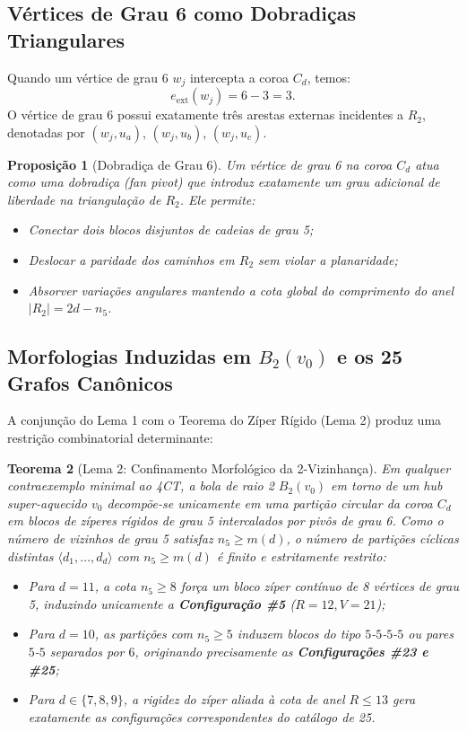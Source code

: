 \documentclass[11pt,a4paper]{article}
\theoremstyle{plain}
\newtheorem{theorem}{Teorema}[section]
\newtheorem{proposition}[theorem]{Proposição}
\theoremstyle{definition}
\begin{document}
\subsection{Vértices de Grau 6 como Dobradiças Triangulares}

Quando um vértice de grau 6 $w_j$ intercepta a coroa $C_d$, temos:
\begin{equation}
e_{\text{ext}}(w_j) = 6 - 3 = 3.
\end{equation}
O vértice de grau 6 possui exatamente três arestas externas incidentes a $R_2$, denotadas por $(w_j, u_a)$, $(w_j, u_b)$, $(w_j, u_c)$. 

\begin{proposition}[Dobradiça de Grau 6]
Um vértice de grau 6 na coroa $C_d$ atua como uma dobradiça (\emph{fan pivot}) que introduz exatamente um grau adicional de liberdade na triangulação de $R_2$. Ele permite:
\begin{itemize}
    \item Conectar dois blocos disjuntos de cadeias de grau 5;
    \item Deslocar a paridade dos caminhos em $R_2$ sem violar a planaridade;
    \item Absorver variações angulares mantendo a cota global do comprimento do anel $|R_2| = 2d - n_5$.
\end{itemize}
\end{proposition}

\subsection{Morfologias Induzidas em \texorpdfstring{$B_2(v_0)$}{B2(v0)} e os 25 Grafos Canônicos}

A conjunção do Lema 1 com o Teorema do Zíper Rígido (Lema 2) produz uma restrição combinatorial determinante:

\begin{theorem}[Lema 2: Confinamento Morfológico da 2-Vizinhança]
Em qualquer contraexemplo minimal ao 4CT, a bola de raio 2 $B_2(v_0)$ em torno de um hub super-aquecido $v_0$ decompõe-se unicamente em uma partição circular da coroa $C_d$ em blocos de zíperes rígidos de grau 5 intercalados por pivôs de grau 6. 
Como o número de vizinhos de grau 5 satisfaz $n_5 \ge m(d)$, o número de partições cíclicas distintas $\langle d_1, \dots, d_d \rangle$ com $n_5 \ge m(d)$ é finito e estritamente restrito:
\begin{itemize}
    \item Para $d = 11$, a cota $n_5 \ge 8$ força um bloco zíper contínuo de 8 vértices de grau 5, induzindo unicamente a \textbf{Configuração \#5} ($R=12, V=21$);
    \item Para $d = 10$, as partições com $n_5 \ge 5$ induzem blocos do tipo $5$-$5$-$5$-$5$ ou pares $5$-$5$ separados por $6$, originando precisamente as \textbf{Configurações \#23 e \#25};
    \item Para $d \in \{7, 8, 9\}$, a rigidez do zíper aliada à cota de anel $R \le 13$ gera exatamente as configurações correspondentes do catálogo de 25.
\end{itemize}
\end{theorem}
\end{document}
